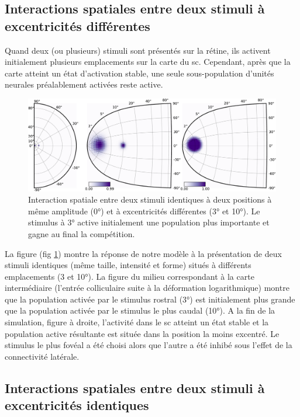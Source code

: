 \subsection{Interactions spatiales entre deux stimuli à excentricités différentes} 


Quand deux (ou plusieurs) stimuli sont présentés sur la rétine, ils activent initialement plusieurs emplacements sur la carte du \gls{sc}. Cependant, après que la carte atteint un état d'activation stable, une seule sous-population d'unités neurales préalablement activées reste active.\\

\begin{figure}
  \begin{center}
      \includegraphics[width=\textwidth]{figures/ch3_8_stimulus-2} 
  \end{center}
  \caption{Interaction spatiale entre deux stimuli identiques à deux positions à même amplitude (0°) et à excentricités différentes (3° et 10°). Le stimulus à 3° active initialement une population plus importante et gagne au final la compétition.
  }
  \label{fig: space}
\end{figure}

 La figure (fig \ref{fig: space}) montre la réponse de notre modèle à la présentation de deux stimuli identiques (même taille, intensité et forme) situés à différents emplacements (3 et 10°). La figure du milieu correspondant à la carte intermédiaire (l'entrée colliculaire suite à la déformation logarithmique) montre que la population activée par le stimulus rostral (3°) est initialement plus grande que la population activée par le stimulus le plus caudal (10°). A la fin de la simulation, figure à droite, l'activité dans le \gls{sc} atteint un état stable et la population active résultante est située dans la position la moins excentré. Le stimulus le plus fovéal a été choisi alors que l'autre a été inhibé sous l'effet de la connectivité latérale.

\subsection{Interactions spatiales entre deux stimuli à excentricités identiques}

